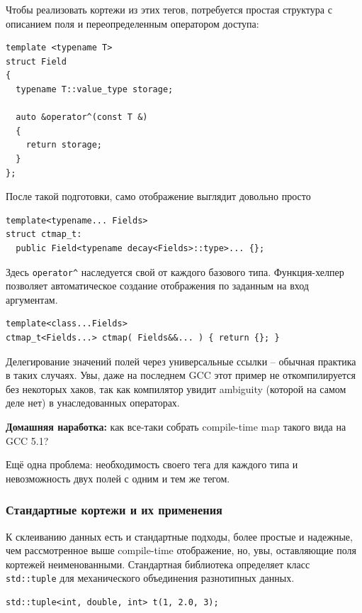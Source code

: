 \documentclass[a4paper,12pt,oneside]{article}
\begin{document}
Чтобы реализовать кортежи из этих тегов, потребуется простая структура с описанием поля и переопределенным оператором доступа:

\begin{lstlisting}
template <typename T>
struct Field 
{
  typename T::value_type storage;

  auto &operator^(const T &) 
  {
    return storage;
  }
};
\end{lstlisting}

После такой подготовки, само отображение выглядит довольно просто

\begin{lstlisting}
template<typename... Fields>
struct ctmap_t: 
  public Field<typename decay<Fields>::type>... {};
\end{lstlisting}

Здесь \lstinline!operator^! наследуется свой от каждого базового типа. Функция-хелпер позволяет автоматическое создание отображения по заданным на вход аргументам.

\begin{lstlisting}
template<class...Fields>
ctmap_t<Fields...> ctmap( Fields&&... ) { return {}; }
\end{lstlisting}

Делегирование значений полей через универсальные ссылки -- обычная практика в таких случаях. Увы, даже на последнем GCC этот пример не откомпилируется без некоторых хаков, так как компилятор увидит ambiguity (которой на самом деле нет) в унаследованных операторах.

\textbf{Домашняя наработка:} как все-таки собрать compile-time map такого вида на GCC 5.1?

Ещё одна проблема: необходимость своего тега для каждого типа и невозможность двух полей с одним и тем же тегом.

\subsubsection{Стандартные кортежи и их применения}\label{StdTuples}

К склеиванию данных есть и стандартные подходы, более простые и надежные, чем рассмотренное выше compile-time отображение, но, увы, оставляющие поля кортежей неименованными. Стандартная библиотека определяет класс \lstinline!std::tuple! для механического объединения разнотипных данных.

\begin{lstlisting}
std::tuple<int, double, int> t(1, 2.0, 3);
\end{lstlisting}
\end{document}
